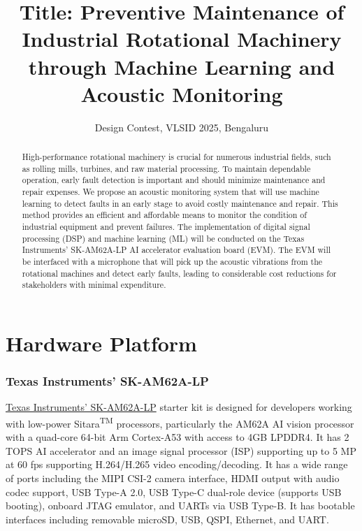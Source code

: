 \documentclass[12pt,twoside]{article}
\title{Title: Preventive Maintenance of Industrial Rotational Machinery through Machine Learning and Acoustic Monitoring}
\author{Design Contest, VLSID 2025, Bengaluru}
\begin{document}
\maketitle

\begin{abstract}
High-performance rotational machinery is crucial for numerous industrial fields, such as rolling mills, turbines, and raw material processing. To maintain dependable operation, early fault detection is important and should minimize maintenance and repair expenses. We propose an acoustic monitoring system that will use machine learning to detect faults in an early stage to avoid costly maintenance and repair. This method provides an efficient and affordable means to monitor the condition of industrial equipment and prevent failures. 
The implementation of digital signal processing (DSP) and machine learning (ML) will be conducted on the Texas Instruments' SK-AM62A-LP AI accelerator evaluation board (EVM). The EVM will be interfaced with a microphone that will pick up the acoustic vibrations from the rotational machines and detect early faults, leading to considerable cost reductions for stakeholders with minimal expenditure.
\end{abstract}

\section{Hardware Platform}

\subsubsection*{Texas Instruments’ SK-AM62A-LP}


\href{https://www.ti.com/tool/SK-AM62A-LP}{Texas Instruments' SK-AM62A-LP} starter kit is designed for developers working with low-power Sitara\textsuperscript{TM} processors, particularly the AM62A AI vision processor with a quad-core 64-bit Arm Cortex-A53 with access to 4GB LPDDR4.
It has 2 TOPS AI accelerator and an image signal processor (ISP) supporting up to 5 MP at 60 fps supporting H.264/H.265 video encoding/decoding. 
It has a wide range of ports including the MIPI CSI-2 camera interface, HDMI output with audio codec support, USB Type-A 2.0, USB Type-C dual-role device (supports USB booting), onboard JTAG emulator, and UARTs via USB Type-B.
It has bootable interfaces including removable microSD, USB, QSPI, Ethernet, and UART.
\end{document}
